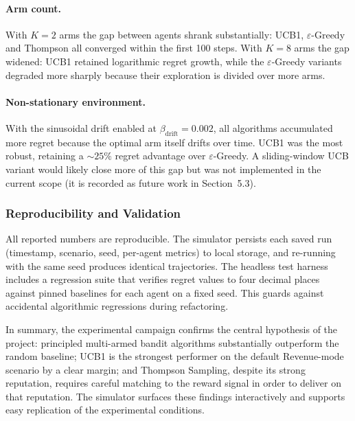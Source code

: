 \paragraph{Arm count.} With $K = 2$ arms the gap between agents shrank substantially: UCB1, $\varepsilon$-Greedy and Thompson all converged within the first 100 steps. With $K = 8$ arms the gap widened: UCB1 retained logarithmic regret growth, while the $\varepsilon$-Greedy variants degraded more sharply because their exploration is divided over more arms.

\paragraph{Non-stationary environment.} With the sinusoidal drift enabled at $\beta_{\text{drift}} = 0.002$, all algorithms accumulated more regret because the optimal arm itself drifts over time. UCB1 was the most robust, retaining a $\sim 25\%$ regret advantage over $\varepsilon$-Greedy. A sliding-window UCB variant would likely close more of this gap but was not implemented in the current scope (it is recorded as future work in Section~5.3).

\subsubsection{Reproducibility and Validation}
All reported numbers are reproducible. The simulator persists each saved run (timestamp, scenario, seed, per-agent metrics) to local storage, and re-running with the same seed produces identical trajectories. The headless test harness includes a regression suite that verifies regret values to four decimal places against pinned baselines for each agent on a fixed seed. This guards against accidental algorithmic regressions during refactoring.

In summary, the experimental campaign confirms the central hypothesis of the project: principled multi-armed bandit algorithms substantially outperform the random baseline; UCB1 is the strongest performer on the default Revenue-mode scenario by a clear margin; and Thompson Sampling, despite its strong reputation, requires careful matching to the reward signal in order to deliver on that reputation. The simulator surfaces these findings interactively and supports easy replication of the experimental conditions.

